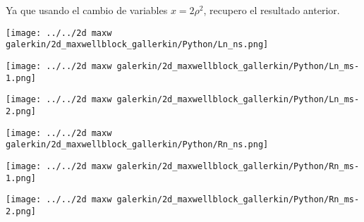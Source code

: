 		Ya que usando el cambio de variables $x=2\rho^2$, recupero el resultado anterior.
		
		
		
		
			\begin{minipage}{0.33\textwidth}
				\begin{center}
					\texttt{[image: ../../2d maxw galerkin/2d\_maxwellblock\_gallerkin/Python/Ln\_ns.png]}
				\end{center}
			\end{minipage}
			\begin{minipage}{0.33\textwidth}
				\begin{center}
					\texttt{[image: ../../2d maxw galerkin/2d\_maxwellblock\_gallerkin/Python/Ln\_ms-1.png]}
				\end{center}
			\end{minipage}	
			\begin{minipage}{0.33\textwidth}
				\begin{center}
					\texttt{[image: ../../2d maxw galerkin/2d\_maxwellblock\_gallerkin/Python/Ln\_ms-2.png]}
				\end{center}
			\end{minipage}
			
			\begin{minipage}{0.33\textwidth}
				\begin{center}
					\texttt{[image: ../../2d maxw galerkin/2d\_maxwellblock\_gallerkin/Python/Rn\_ns.png]}
				\end{center}
			\end{minipage}
			\begin{minipage}{0.33\textwidth}
				\begin{center}
					\texttt{[image: ../../2d maxw galerkin/2d\_maxwellblock\_gallerkin/Python/Rn\_ms-1.png]}
				\end{center}
			\end{minipage}	
			\begin{minipage}{0.33\textwidth}
				\begin{center}
					\texttt{[image: ../../2d maxw galerkin/2d\_maxwellblock\_gallerkin/Python/Rn\_ms-2.png]}
				\end{center}
			\end{minipage}

